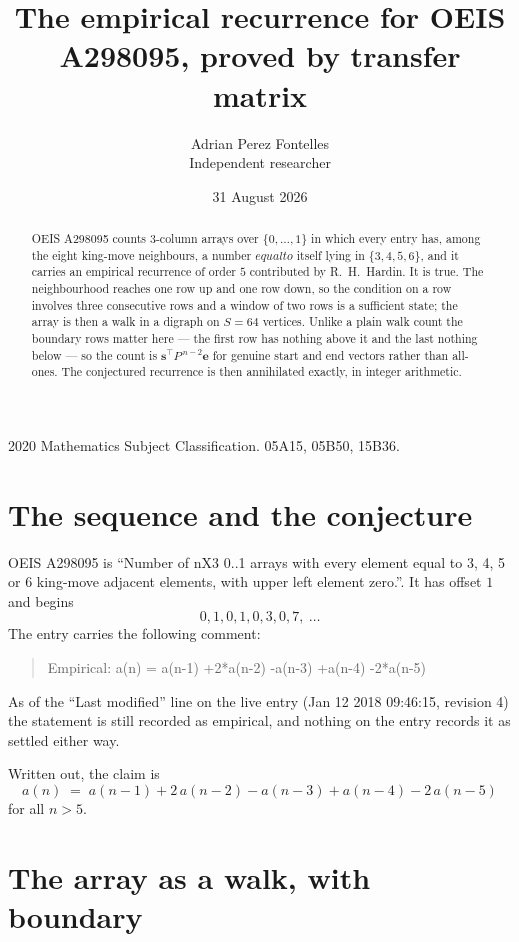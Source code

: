 \documentclass[11pt,a4paper]{article}
\title{The empirical recurrence for OEIS A298095, proved by transfer matrix}
\author{Adrian Perez Fontelles\\ \small Independent researcher}
\date{31 August 2026}
\theoremstyle{plain}
\theoremstyle{definition}
\begin{document}
\maketitle

\begin{abstract}
OEIS A298095 counts $3$-column arrays over $\{0,\dots,1\}$ in which every entry has,
among the eight king-move neighbours, a number $equal to$ itself lying in $\{3,4,5,6\}$, and it carries an empirical
recurrence of order $5$ contributed by R.~H.~Hardin. It is true. The neighbourhood
reaches one row up and one row down, so the condition on a row involves three consecutive
rows and a window of two rows is a sufficient state; the array is then a walk in a digraph
on $S=64$ vertices. Unlike a plain walk count the boundary rows matter here --- the first
row has nothing above it and the last nothing below --- so the count is
$\mathbf{s}^{\!\top}P^{\,n-2}\mathbf{e}$ for genuine start and end vectors rather than
all-ones. The conjectured recurrence is then annihilated exactly, in integer arithmetic.
\end{abstract}

\noindent\small 2020 Mathematics Subject Classification. 05A15, 05B50, 15B36.\normalsize

\section{The sequence and the conjecture}

OEIS A298095 is ``Number of nX3 0..1 arrays with every element equal to 3, 4, 5 or 6 king-move adjacent elements, with upper left element zero.''. It has offset
$1$ and begins
\[
0, 1, 0, 1, 0, 3, 0, 7,\ \dots
\]
The entry carries the following comment:
\begin{quote}\small
Empirical: a(n) = a(n-1) +2*a(n-2) -a(n-3) +a(n-4) -2*a(n-5)
\end{quote}
As of the ``Last modified'' line on the live entry (Jan 12 2018 09:46:15, revision
4) the statement is still recorded as empirical, and nothing on the entry
records it as settled either way.

Written out, the claim is
\begin{equation}\label{eq:conj}
a(n)\;=\;a(n-1) + 2\,a(n-2) - a(n-3) + a(n-4) - 2\,a(n-5)
\end{equation}
for all $n>5$.

\section{The array as a walk, with boundary}
\end{document}

